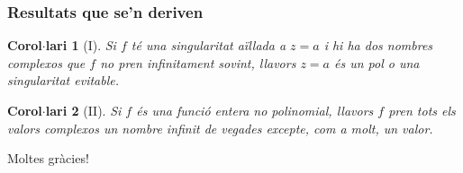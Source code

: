 \documentclass{beamer}
\newtheorem{corollari}{Corol$\cdot$lari}[teorema]
\begin{document}
\begin{frame}
\frametitle{Resultats que se'n deriven}


\begin{corollari}[I]
Si $f$ té una singularitat aïllada a $z=a$ i hi ha dos nombres complexos que $f$ no pren infinitament sovint, llavors $z=a$ és un pol o una singularitat evitable.
\end{corollari}

\begin{corollari}[II]
Si $f$ és una funció entera no polinomial, llavors $f$ pren tots els valors complexos un nombre infinit de vegades excepte, com a molt, un valor.
\end{corollari}

\end{frame}



\begin{frame}
\Large{\centerline{Moltes gràcies!}}
\end{frame}
\end{document}
